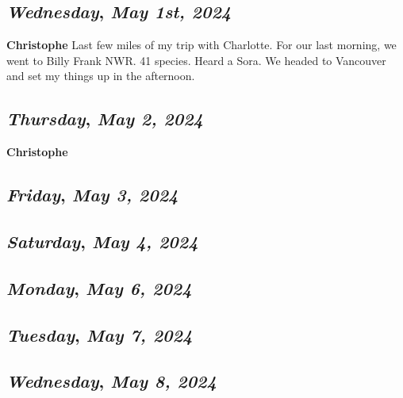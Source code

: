 \begin{center}
\section*{\month}
\end{center}

\def\day{\textit{May 1st, 2024}}
\def\weekday{\textit{Wednesday}}
\subsection*{\weekday, \day}
\textbf{Christophe}
Last few miles of my trip with Charlotte. For our last morning, we went to Billy Frank NWR. 41 species. Heard a Sora. 
We headed to Vancouver and set my things up in the afternoon. 

\def\day{\textit{May 2, 2024}}
\def\weekday{\textit{Thursday}}
\subsection*{\weekday, \day}
\textbf{Christophe}


\def\day{\textit{May 3, 2024}}
\def\weekday{\textit{Friday}}
\subsection*{\weekday, \day}

\def\day{\textit{May 4, 2024}}
\def\weekday{\textit{Saturday}}
\subsection*{\weekday, \day}

\def\day{\textit{May 6, 2024}}
\def\weekday{\textit{Monday}}
\subsection*{\weekday, \day}

\def\day{\textit{May 7, 2024}}
\def\weekday{\textit{Tuesday}}
\subsection*{\weekday, \day}

\def\day{\textit{May 8, 2024}}
\def\weekday{\textit{Wednesday}}
\subsection*{\weekday, \day}

